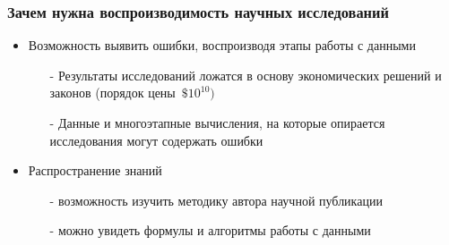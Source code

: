 \documentclass[10pt,pdf,hyperref={unicode}]{beamer}
\begin{document}
\begin{frame} 
	\frametitle [Зачем нужна воспроизводимость] {Зачем нужна воспроизводимость научных исследований }
\begin{itemize}
\item Возможность выявить ошибки, воспроизводя этапы работы с данными  
\begin{itemize}
	\item[-] Результаты исследований ложатся в основу экономических решений и законов (порядок цены~$\$10^{10})$
	\item[-] Данные и многоэтапные  вычисления, на которые опирается исследования могут содержать ошибки
\end{itemize}
\item  Распространение знаний
    \begin{itemize}
       \item[-] возможность изучить методику автора научной публикации
       \item[-] можно увидеть формулы и алгоритмы работы с данными  
    \end{itemize}
    
\end{itemize}
\end{frame}	
\end{document}
